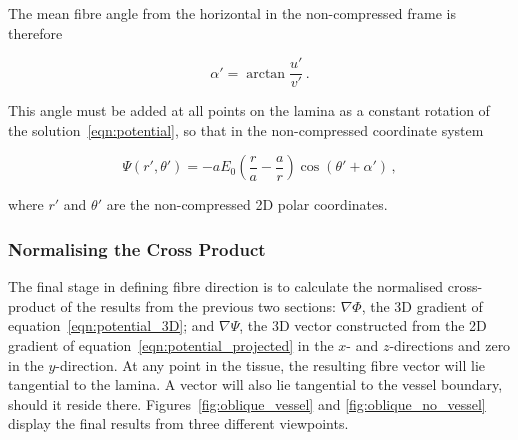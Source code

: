     The mean fibre angle from the horizontal in the non-compressed frame is therefore
    
    \begin{equation}
      \alpha' = \arctan \frac{u'}{v'}\,.
    \end{equation}
    
    This angle must be added at all points on the lamina as a constant rotation of the solution~\ref{eqn:potential}, so that in the non-compressed coordinate system
    
    \begin{equation}
      \Psi(r',\theta') = -aE_0 \left( \frac{r}{a} - \frac{a}{r} \right) \cos\left( \theta' + \alpha' \right)\,,
      \label{eqn:potential_projected}
    \end{equation}
    
    where $r'$ and $\theta'$ are the non-compressed 2D polar coordinates.
  
  \subsubsection{Normalising the Cross Product} %
  \label{sub:normalising_the_cross_product}
    The final stage in defining fibre direction is to calculate the normalised cross-product of the results from the previous two sections: $\nabla\Phi$, the 3D gradient of equation~\ref{eqn:potential_3D}; and $\nabla\Psi$, the 3D vector constructed from the 2D gradient of equation~\ref{eqn:potential_projected} in the $x$- and $z$-directions and zero in the $y$-direction. At any point in the tissue, the resulting fibre vector will lie tangential to the lamina. A vector will also lie tangential to the vessel boundary, should it reside there. Figures~\ref{fig:oblique_vessel} and \ref{fig:oblique_no_vessel} display the final results from three different viewpoints.
    
